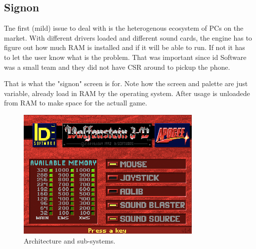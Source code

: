\documentclass[book.tex]{subfiles}
\begin{document}
\subsection{Signon}
Tne first (mild) issue to deal with is the heterogenous ecosystem of PCs on the market. With different drivers loaded and different sound cards, the engine has to figure out how much RAM is installed and if it will be able to run. If not it has to let the user know what is the problem. That was important since id Software was a small team and they did not have CSR around to pickup the phone.\\
\par
That is what the "signon" screen is for. Note how the screen and palette are just variable, already load in RAM by the operating system. After usage  is unloadede from RAM to make space for the actuall game.\\
\par
\begin{figure}[H]
\centering
\includegraphics[width=\textwidth]{screenshots/signon.png}
\caption{Architecture and sub-systems.}
\end{figure}
\par
\end{document}
